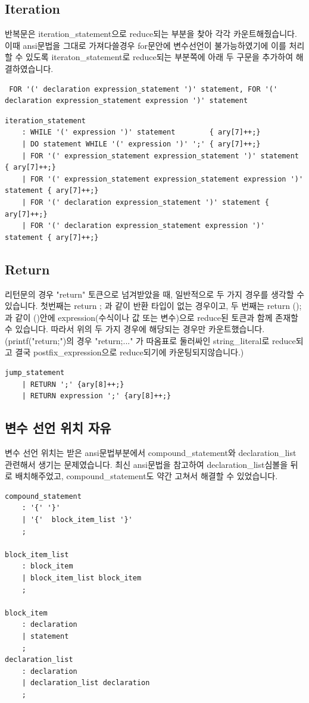 \documentclass{article}
\begin{document}
    \subsection{Iteration}
        반복문은 iteration\_statement으로 reduce되는 부분을 찾아 각각 카운트해줬습니다. 이때 ansi문법을 그대로 가져다쓸경우 for문안에 변수선언이 불가능하였기에 이를 처리할 수 있도록
        iteraton\_statement로 reduce되는 부분쪽에 아래 두 구문을 추가하여 해결하였습니다.
        \begin{verbatim} FOR '(' declaration expression_statement ')' statement, FOR '(' declaration expression_statement expression ')' statement \end{verbatim}
\begin{verbatim}
iteration_statement
	: WHILE '(' expression ')' statement		{ ary[7]++;}
	| DO statement WHILE '(' expression ')' ';' { ary[7]++;}
	| FOR '(' expression_statement expression_statement ')' statement { ary[7]++;}
	| FOR '(' expression_statement expression_statement expression ')' statement { ary[7]++;} 
	| FOR '(' declaration expression_statement ')' statement { ary[7]++;}
	| FOR '(' declaration expression_statement expression ')' statement { ary[7]++;} 

\end{verbatim}
    \subsection{Return}
        리턴문의 경우 "return" 토큰으로 넘겨받았을 때, 일반적으로 두 가지 경우를 생각할 수 있습니다. 첫번째는 return ; 과 같이 반환 타입이 없는 경우이고, 두 번째는 return ();과 같이 ()안에 expression(수식이나 값 또는 변수)으로 reduce된 토큰과 함께 존재할 수 있습니다.
        따라서 위의 두 가지 경우에 해당되는 경우만 카운트했습니다. (printf("return;")의 경우 "return;..." 가 따옴표로 둘러싸인 string\_literal로 reduce되고 결국 postfix\_expression으로 reduce되기에 카운팅되지않습니다.)
\begin{verbatim}
jump_statement
	| RETURN ';' {ary[8]++;} 
	| RETURN expression ';' {ary[8]++;} 
\end{verbatim}
\newpage
    \subsection{변수 선언 위치 자유}
        변수 선언 위치는 받은 ansi문법부분에서 compound\_statement와 declaration\_list 관련해서 생기는 문제였습니다. 최신 ansi문법을 참고하여 declaration\_list심볼을 뒤로 배치해주었고, compound\_statement도 약간 고쳐서 해결할 수 있었습니다.\\
\begin{verbatim}
compound_statement
	: '{' '}'
	| '{'  block_item_list '}'
	;

block_item_list
	: block_item
	| block_item_list block_item
	;

block_item
	: declaration
	| statement
	;
declaration_list
	: declaration
	| declaration_list declaration
	;
\end{verbatim}
\end{document}
